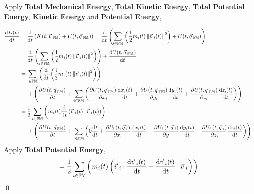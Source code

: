 \documentclass[12pt]{amsart}
\renewenvironment{proof}{{\bfseries Proof.}}{\qed}
\let\oldvec\vec
\renewcommand{\vec}[1]{\oldvec{#1}\hspace{0.1em}}
\begin{document}
\begin{proof}
Apply \textbf{Total Mechanical Energy}, \textbf{Total Kinetic Energy}, \textbf{Total Potential Energy}, \textbf{Kinetic Energy} and \textbf{Potential Energy},

\begin{align*}
\dfrac{\mathrm{d} E(t)}{\mathrm{d} t} 
&= \dfrac{\mathrm{d}}{\mathrm{d} t} \left( K (t, \vec{v}_\mathbb{PM}) + U  (t, \vec{q}_\mathbb{PM}) \right) = \dfrac{\mathrm{d}}{\mathrm{d} t} \left( \displaystyle\sum_{i \in \mathbb{PM}}\left(\dfrac{1}{2}  m_i (t) \left \| \vec{v}_i (t) \right \|^2 \right) + U  (t, \vec{q}_\mathbb{PM}) \right) \\ 
&= \dfrac{\mathrm{d}}{\mathrm{d} t} \left( \displaystyle\sum_{i \in \mathbb{PM}} \left( \dfrac{1}{2} m_i (t) \left \| \vec{v}_i (t) \right \|^2 \right) \right) + \dfrac{\mathrm{d} U  (t, \vec{q}_\mathbb{PM})}{\mathrm{d} t} \\ 
&= \displaystyle\sum_{i \in \mathbb{PM}}\left( \dfrac{\mathrm{d}}{\mathrm{d} t} \left( \dfrac{1}{2} m_i (t) \left \| \vec{v}_i (t) \right \|^2 \right) \right) \\
& \quad \ + \left ( \dfrac{\partial U  (t, \vec{q}_\mathbb{PM})}{\partial t} + \displaystyle \sum_{i \in \mathbb{PM}} \left ( \dfrac{\partial U  (t, \vec{q}_\mathbb{PM})}{\partial x_i}\dfrac{\mathrm{d} x_i(t)}{\mathrm{d} t} + \dfrac{\partial U  (t, \vec{q}_\mathbb{PM})}{\partial y_i}\dfrac{\mathrm{d} y_i(t)}{\mathrm{d} t} + \dfrac{\partial U  (t, \vec{q}_\mathbb{PM})}{\partial z_i}\dfrac{\mathrm{d} z_i(t)}{\mathrm{d} t} \right ) \right ) \\ 
&= \dfrac{1}{2} \displaystyle\sum_{i \in \mathbb{PM}}\left( m_i (t) \dfrac{\mathrm{d}}{\mathrm{d} t} \left( \vec{v}_i (t) \cdot \vec{v}_i (t) \right) \right)\\
& \quad \ + \left ( \dfrac{\partial U  (t, \vec{q}_\mathbb{PM})}{\partial t} + \displaystyle \sum_{i \in \mathbb{PM}} \left ( 0 \dfrac{\mathrm{d} t}{\mathrm{d} t} +\dfrac{\partial  U_i \left ( t, \vec{q}_i \right )}{\partial x_i}\dfrac{\mathrm{d} x_i(t)}{\mathrm{d} t} + \dfrac{\partial  U_i \left ( t, \vec{q}_i \right )}{\partial y_i}\dfrac{\mathrm{d} y_i(t)}{\mathrm{d} t} + \dfrac{\partial  U_i \left ( t, \vec{q}_i \right )}{\partial z_i}\dfrac{\mathrm{d} z_i(t)}{\mathrm{d} t} \right ) \right )
\end{align*}
Apply \textbf{Total Potential Energy},
\begin{align*}
&= \dfrac{1}{2}\displaystyle\sum_{i \in \mathbb{PM}}\left( m_i (t) \left ( \vec{v}_i \cdot \dfrac{\mathrm{d} \vec{v}_i (t)}{\mathrm{d} t} + \dfrac{\mathrm{d} \vec{v}_i (t)}{\mathrm{d} t} \cdot \vec{v}_i\right) \right )\\

\end{align*}
\end{proof}
\end{document}
